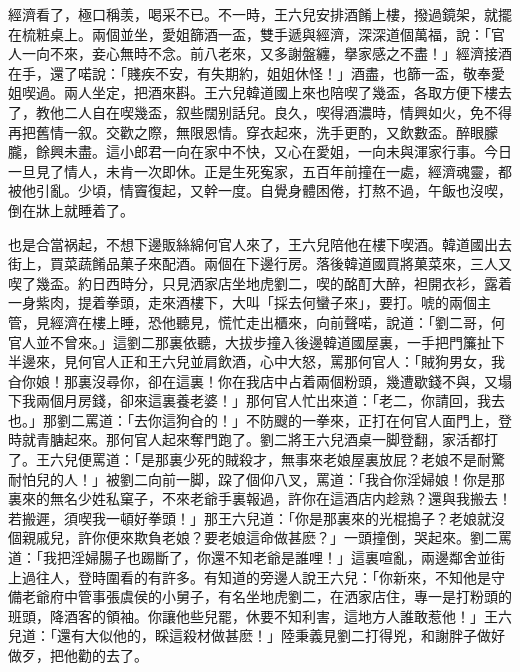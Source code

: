 經濟看了，極口稱羡，喝采不已。不一時，王六兒安排酒餚上樓，撥過鏡架，就擺在梳粧桌上。兩個並坐，愛姐篩酒一盃，雙手遞與經濟，深深道個萬福，說：「官人一向不來，妾心無時不念。前八老來，又多謝盤纏，擧家感之不盡！」經濟接酒在手，還了喏說：「賤疾不安，有失期約，姐姐休怪！」酒盡，也篩一盃，敬奉愛姐喫過。兩人坐定，把酒來斟。王六兒韓道國上來也陪喫了幾盃，各取方便下樓去了，教他二人自在喫幾盃，叙些闊别話兒。良久，喫得酒濃時，情興如火，免不得再把舊情一叙。交歡之際，無限恩情。穿衣起來，洗手更酌，又飲數盃。醉眼朦朧，餘興未盡。這小郎君一向在家中不快，又心在愛姐，一向未與渾家行事。今日一旦見了情人，未肯一次即休。正是生死寃家，五百年前撞在一處，經濟魂靈，都被他引亂。少頃，情竇復起，又幹一度。自覺身體困倦，打熬不過，午飯也沒喫，倒在牀上就睡着了。

也是合當祸起，不想下邊販絲綿何官人來了，王六兒陪他在樓下喫酒。韓道國出去街上，買菜蔬餚品菓子來配酒。兩個在下邊行房。落後韓道國買將菓菜來，三人又喫了幾盃。約日西時分，只見洒家店坐地虎劉二，喫的酩酊大醉，袒開衣衫，露着一身紫肉，提着拳頭，走來酒樓下，大叫「採去何蠻子來」，要打。唬的兩個主管，見經濟在樓上睡，恐他聽見，慌忙走出櫃來，向前聲喏，說道：「劉二哥，何官人並不曾來。」這劉二那裏依聽，大拔步撞入後邊韓道國屋裏，一手把門簾扯下半邊來，見何官人正和王六兒並肩飲酒，心中大怒，罵那何官人：「賊狗男女，我㒲你娘！那裏沒尋你，卻在這裏！你在我店中占着兩個粉頭，幾遭歇錢不與，又塌下我兩個月房錢，卻來這裏養老婆！」那何官人忙出來道：「老二，你請回，我去也。」那劉二罵道：「去你這狗㒲的！」不防颼的一拳來，正打在何官人面門上，登時就青膅起來。那何官人起來奪門跑了。劉二將王六兒酒桌一脚登翻，家活都打了。王六兒便罵道：「是那裏少死的賊殺才，無事來老娘屋裏放屁？老娘不是耐驚耐怕兒的人！」被劉二向前一脚，跥了個仰八叉，罵道：「我㒲你淫婦娘！你是那裏來的無名少姓私窠子，不來老爺手裏報過，許你在這酒店内趁熟？還與我搬去！若搬遲，須喫我一頓好拳頭！」那王六兒道：「你是那裏來的光棍搗子？老娘就沒個親戚兒，許你便來欺負老娘？要老娘這命做甚麽？」一頭撞倒，哭起來。劉二罵道：「我把淫婦腸子也踢斷了，你還不知老爺是誰哩！」這裏喧亂，兩邊鄰舍並街上過往人，登時圍看的有許多。有知道的旁邊人說王六兒：「你新來，不知他是守備老爺府中管事張虞侯的小舅子，有名坐地虎劉二，在洒家店住，專一是打粉頭的班頭，降酒客的領袖。你讓他些兒罷，休要不知利害，這地方人誰敢惹他！」王六兒道：「還有大似他的，睬這殺材做甚麽！」陸秉義見劉二打得兇，和謝胖子做好做歹，把他勸的去了。


